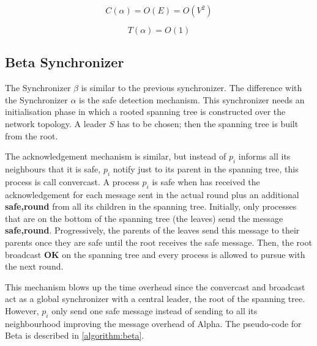 \begin{equation}
\label{ec:message-alpha}
 C(\alpha) = O(E) = O(V^2) 
\end{equation}

\begin{equation}
\label{ec:time-alpha}
 T(\alpha) = O(1) 
\end{equation}


\subsection{Beta Synchronizer}

The Synchronizer $\beta$ is similar to the previous synchronizer. The difference with the Synchronizer $\alpha$ is the safe detection mechanism. This synchronizer needs an initialisation phase in which a rooted spanning tree is constructed over the network topology. A leader $S$ has to be chosen; then the spanning tree is built from the root. 

The acknowledgement mechanism is similar, but instead of $p_i$ informs all its neighbours that it is safe, $p_i$ notify just to its parent in the spanning tree, this process is call convercast. A process $p_i$ is safe when has received the acknowledgement for each message sent in the actual round plus an additional \textbf{safe,round} from all its children in the spanning tree. Initially, only processes that are on the bottom of the spanning tree (the leaves) send the message \textbf{safe,round}. Progressively, the parents of the leaves send this message to their parents once they are safe until the root receives the safe message. Then, the root broadcast \textbf{OK} on the spanning tree and every process is allowed to pursue with the next round. 

This mechanism blows up the time overhead since the convercast and broadcast act as a global synchronizer with a central leader, the root of the spanning tree. However, $p_i$ only send one safe message instead of sending to all its neighbourhood improving the message overhead of Alpha. The pseudo-code for Beta is described in \ref{algorithm:beta}.



